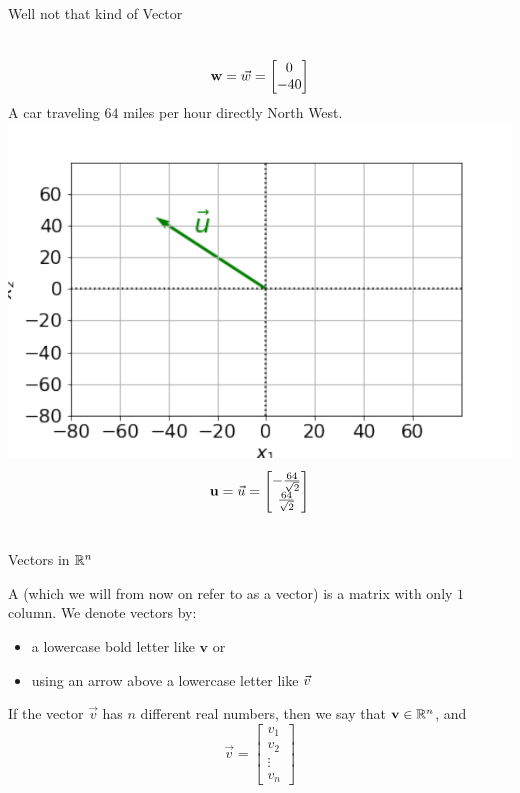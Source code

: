 \documentclass[xcoler=dvipsnames, aspectratio=169]{beamer}
\begin{document}
\begin{frame}{Well not that kind of Vector}
\begin{example}
\begin{columns}
                \[
                    \vec{w} = \vecOld{w}  = \begin{bmatrix}
                        0 \\ -40
                    \end{bmatrix}
                \]
                A car traveling $64$ miles per hour directly North West.
                \includegraphics[height=.3\textheight]{images/fig-northwest.pdf}
                \[
                    \vec{u} = \vecOld{u} = \begin{bmatrix}
                        -\frac{64}{\sqrt{2}} \\ \frac{64}{\sqrt{2}}
                    \end{bmatrix}
                \]
            \end{columns}
        \end{example}
    \end{frame}
    \begin{frame}{Vectors in $\mathbb{R}^n$}
        \begin{defn}
            A  (which we will from now on refer to as a vector) is a matrix with
            only $1$ column. \pause We denote vectors by:
            \begin{itemize}
                \item a lowercase bold letter like $\mathbf{v}$ or
                \item using an arrow above a lowercase letter like $\vecOld{v}$
            \end{itemize}
        \end{defn}
        \pause
        If the vector $\vec{v}$ has $n$ different real numbers, then we say that $\mathbf{v}\in\mathbb{R}^n$, and
        \[
            \vec{v} = \begin{bmatrix}
                v_1\\
                v_2\\
                \vdots\\
                v_n
            \end{bmatrix}
        \]
    \end{frame}
\end{document}
